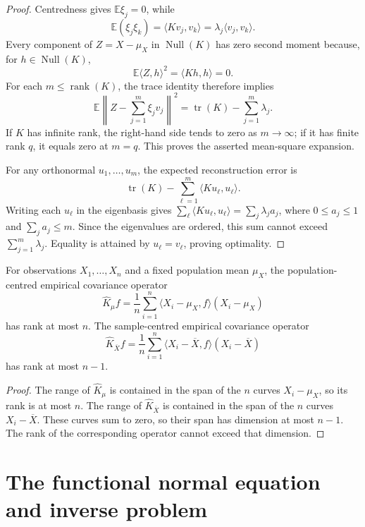 \begin{proof}
Centredness gives $\mathbb E\xi_j=0$, while
\[
 \mathbb E(\xi_j\xi_k)
 =\langle Kv_j,v_k\rangle
 =\lambda_j\langle v_j,v_k\rangle.
\]
Every component of $Z=X-\mu_X$ in $\operatorname{Null}(K)$ has zero second
moment because, for $h\in\operatorname{Null}(K)$,
\[
    \mathbb E\langle Z,h\rangle^2=\langle Kh,h\rangle=0.
\]
For each $m\leq\operatorname{rank}(K)$, the trace identity therefore implies
\[
 \mathbb E\left\|Z-\sum_{j=1}^m\xi_jv_j\right\|^2
 =\operatorname{tr}(K)-\sum_{j=1}^m\lambda_j.
\]
If $K$ has infinite rank, the right-hand side tends to zero as
$m\to\infty$; if it has finite rank $q$, it equals zero at $m=q$.  This
proves the asserted mean-square expansion.

For any orthonormal $u_1,\ldots,u_m$, the expected reconstruction error is
\[
 \operatorname{tr}(K)-\sum_{\ell=1}^m\langle Ku_\ell,u_\ell\rangle.
\]
Writing each $u_\ell$ in the eigenbasis gives
$\sum_\ell\langle Ku_\ell,u_\ell\rangle=\sum_j\lambda_ja_j$, where
$0\leq a_j\leq1$ and $\sum_j a_j\leq m$.  Since the eigenvalues are ordered,
this sum cannot exceed $\sum_{j=1}^m\lambda_j$.  Equality is attained by
$u_\ell=v_\ell$, proving optimality.
\end{proof}

\begin{proposition}
\label{prop:app-empirical-rank}
For observations $X_1,\ldots,X_n$ and a fixed population mean $\mu_X$, the
population-centred empirical covariance operator
\[
 \widehat K_{\mu}f=\frac1n\sum_{i=1}^n
 \langle X_i-\mu_X,f\rangle(X_i-\mu_X)
\]
has rank at most $n$.  The sample-centred empirical covariance operator
\[
 \widehat K_{\overline X}f=\frac1n\sum_{i=1}^n
 \langle X_i-\overline X,f\rangle(X_i-\overline X)
\]
has rank at most $n-1$.
\end{proposition}

\begin{proof}
The range of $\widehat K_{\mu}$ is contained in the span of the $n$ curves
$X_i-\mu_X$, so its rank is at most $n$.  The range of
$\widehat K_{\overline X}$ is contained in the span of the $n$ curves
$X_i-\overline X$.  These curves sum to zero, so their span has dimension at
most $n-1$.  The rank of the corresponding operator cannot exceed that
dimension.
\end{proof}

\section{The functional normal equation and inverse problem}
\label{sec:app-regression-proofs}

